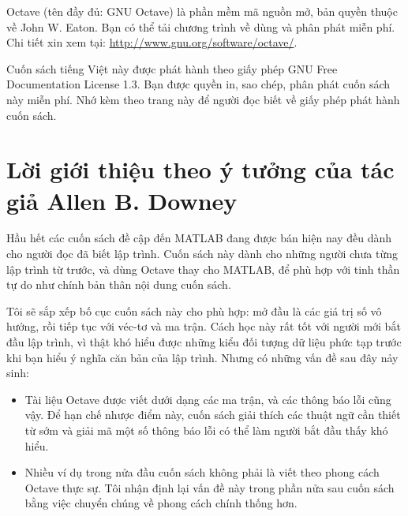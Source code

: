 \documentclass[12pt]{book}
\begin{document}
Octave (tên đầy đủ: GNU Octave) là phần mềm mã nguồn mở, bản quyền thuộc về
John W. Eaton. Bạn có thể tải chương trình về dùng và phân phát miễn phí. Chi tiết
xin xem tại: \url{http://www.gnu.org/software/octave/}.

Cuốn sách tiếng Việt này được phát hành theo giấy phép GNU Free Documentation
License 1.3. Bạn được quyền in, sao chép, phân phát cuốn sách này miễn phí. Nhớ
kèm theo trang này để người đọc biết về giấy phép phát hành cuốn sách. 






\chapter{Lời giới thiệu theo ý tưởng của tác giả Allen B. Downey}

Hầu hết các cuốn sách đề cập đến MATLAB đang được bán hiện nay đều 
dành cho người đọc đã biết lập trình. Cuốn sách này dành cho những 
người chưa từng lập trình từ trước, và dùng Octave thay cho MATLAB,
để phù hợp với tinh thần tự do như chính bản thân nội dung cuốn sách.

Tôi sẽ sắp xếp bố cục cuốn sách này cho phù hợp: mở đầu là
các giá trị số vô hướng, rồi tiếp tục với véc-tơ và ma trận. Cách học 
này rất tốt với người mới bắt đầu lập trình, vì thật khó hiểu được
những kiểu đối tượng dữ liệu phức tạp trước khi bạn hiểu ý nghĩa
căn bản của lập trình. Nhưng có những vấn đề sau đây nảy sinh:

\begin{itemize}

\item Tài liệu Octave được viết dưới dạng các ma trận, và các
thông báo lỗi cũng vậy. Để hạn chế nhược điểm này, cuốn sách
giải thích các thuật ngữ cần thiết từ sớm và giải mã một số 
thông báo lỗi có thể làm người bắt đầu thấy khó hiểu.

\item Nhiều ví dụ trong nửa đầu cuốn sách không phải là viết theo
phong cách Octave thực sự. Tôi nhận định lại vấn đề này trong phần
nửa sau cuốn sách bằng việc chuyển chúng về phong cách chính thống
hơn.

\end{itemize}
\end{document}
